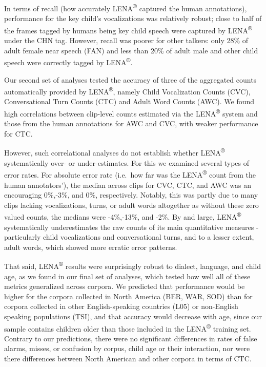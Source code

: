\documentclass[english,floatsintext,man]{apa6}
\begin{document}
In terms of recall (how accurately LENA\textsuperscript{®} captured the
human annotations), performance for the key child's vocalizations was
relatively robust; close to half of the frames tagged by humans being
key child speech were captured by LENA\textsuperscript{®} under the CHN
tag. However, recall was poorer for other talkers: only 28\% of adult
female near speech (FAN) and less than 20\% of adult male and other
child speech were correctly tagged by LENA\textsuperscript{®}.

Our second set of analyses tested the accuracy of three of the
aggregated counts automatically provided by LENA\textsuperscript{®},
namely Child Vocalization Counts (CVC), Conversational Turn Counts (CTC)
and Adult Word Counts (AWC). We found high correlations between
clip-level counts estimated via the LENA\textsuperscript{®} system and
those from the human annotations for AWC and CVC, with weaker
performance for CTC.

However, such correlational analyses do not establish whether
LENA\textsuperscript{®} systematically over- or under-estimates. For
this we examined several types of error rates. For absolute error rate
(i.e.~how far was the LENA\textsuperscript{®} count from the human
annotators'), the median across clips for CVC, CTC, and AWC was an
encouraging 0\%,-3\%, and 0\%, respectively. Notably, this was partly
due to many clips lacking vocalizations, turns, or adult words
altogether as without these zero valued counts, the medians were
-4\%,-13\%, and -2\%. By and large, LENA\textsuperscript{®}
systematically underestimates the raw counts of its main quantitative
measures - particularly child vocalizations and conversational turns,
and to a lesser extent, adult words, which showed more erratic error
patterns.

That said, LENA\textsuperscript{®} results were surprisingly robust to
dialect, language, and child age, as we found in our final set of
analyses, which tested how well all of these metrics generalized across
corpora. We predicted that performance would be higher for the corpora
collected in North America (BER, WAR, SOD) than for corpora collected in
other English-speaking countries (L05) or non-English speaking
populations (TSI), and that accuracy would decrease with age, since our
sample contains children older than those included in the
LENA\textsuperscript{®} training set. Contrary to our predictions, there
were no significant differences in rates of false alarms, misses, or
confusion by corpus, child age or their interaction, nor were there
differences between North American and other corpora in terms of CTC.
\end{document}
